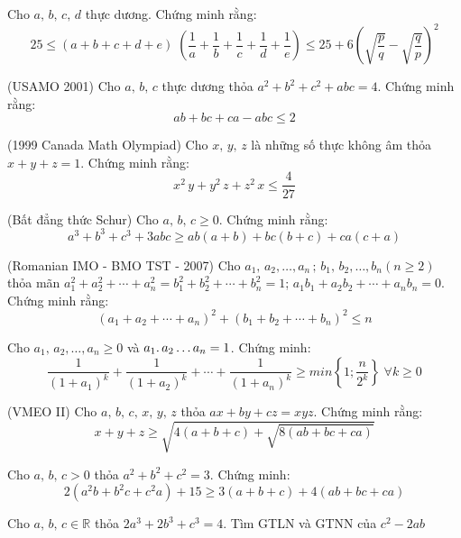 \begin{bt}
 Cho $a,\,b,\,c,\,d$ thực dương. Chứng minh rằng:$$25 \leq \left(a+b+c+d+e\right)\;\left(\dfrac{1}{a}+\dfrac{1}{b}+\dfrac{1}{c}+\dfrac{1}{d}+\dfrac{1}{e}\right) \leq 25+6\left(\sqrt{\dfrac{p}{q}}-\sqrt{\dfrac{q}{p}}\right)^{2}$$
	
\end{bt}
\begin{bt}(USAMO 2001) Cho $a,\,b,\,c$ thực dương thỏa $a^{2}+b^{2}+c^{2}+abc=4$. Chứng minh rằng:$$ab+bc+ca-abc \leq 2$$
\end{bt}
\begin{bt}(1999 Canada Math Olympiad) Cho $x,\,y,\,z$ là những số thực không âm thỏa $x+y+z=1$. Chứng minh rằng:$$x^{2}\,y+y^{2}\,z+z^{2}\,x \leq \dfrac{4}{27}$$
\end{bt}
\begin{bt}(Bất đẳng thức Schur) Cho $a,\,b,\,c \geq 0 $. Chứng minh rằng:$$a^{3}+b^{3}+c^{3}+3abc \geq ab\left(a+b\right)+bc\left(b+c\right)+ca\left(c+a\right)$$
\end{bt}
\begin{bt}
(Romanian IMO - BMO TST - 2007) Cho $a_{1}, \, a_{2}, \ldots, a_n\, ;\,b_{1}, \,b_{2}, \ldots ,b_n \left(n \geq 2 \right) $ thỏa mãn $a_{1}^{2}+a_{2}^{2}+\cdots +a_n^{2} = b_{1}^{2}+b_{2}^{2}+\cdots +b_n^{2} =1$; $a_{1}b_{1}+a_{2}b_{2}+\cdots +a_nb_n=0$. Chứng minh rằng:$$\left(a_{1}+a_{2}+ \cdots + a_n\right)^{2}+\left(b_{1}+b_{2}+ \cdots  +b_n\right)^{2} \leq n$$
\end{bt}
\begin{bt}
Cho $a_{1}, \, a_{2}, \ldots, a_n \geq 0$ và $a_{1}\ldotp a_{2} \ldots a_n = 1$. Chứng minh: $$\dfrac{1}{\left(1+a_{1}\right)^k}+\dfrac{1}{\left(1+a_{2}\right)^k}+ \cdots +\dfrac{1}{\left(1+a_n\right)^k} \geq min\left\lbrace1; \dfrac{n}{2^k} \right\rbrace \; \forall k \geq 0$$
\end{bt}
\begin{bt}
(VMEO II) Cho $a,\,b,\,c, \,x, \,y, \, z$ thỏa $ax+by+cz=xyz$. Chứng minh rằng:$$x+y+z \geq  \sqrt{4\left(a+b+c\right)+\sqrt{8\left(ab+bc+ca\right)}}$$	
\end{bt}

\begin{bt}
Cho $a,\,b,\,c > 0$ thỏa $a^{2}+b^{2}+c^{2}=3$. Chứng minh:$$2\left(a^{2}b+b^{2}c+c^{2}a\right)+15 \geq 3\left(a+b+c\right)+4\left(ab+bc+ca\right)$$	
\end{bt}
 
\begin{bt}
 Cho $a,\,b,\,c \in \mathbb{R}$ thỏa $2a^{3}+2b^{3}+c^{3}=4$. Tìm GTLN và GTNN của $c^{2}-2ab$	
\end{bt}

